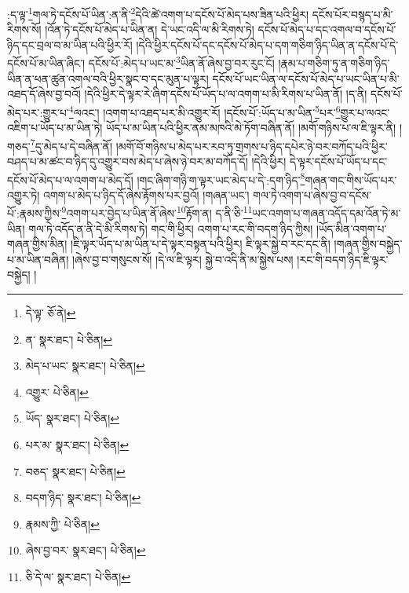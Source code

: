 :ད་ལྟ་\footnote{དེ་ལྟ་  ཅོ་ནེ། }གལ་ཏེ་དངོས་པོ་ཡིན་:ན་ནི་\footnote{ན་  སྣར་ཐང་།  པེ་ཅིན། }དེའི་ཚེ་འགག་པ་དངོས་པོ་མེད་པས་ཟིན་པའི་ཕྱིར། དངོས་པོར་བསྙད་པ་མི་རིགས་སོ། །འོན་ཏེ་དངོས་པོ་མེད་པ་ཡིན་ན། དེ་ཡང་འདི་ལ་མི་རིགས་ཏེ། དངོས་པོ་མེད་པ་དང་འགལ་བ་དངོས་པོ་ཉིད་དང་བྲལ་བ་མ་ཡིན་པའི་ཕྱིར་རོ། །དེའི་ཕྱིར་དངོས་པོ་དང་དངོས་པོ་མེད་པ་དག་གཅིག་ཉིད་ཡིན་ན་དངོས་པོ་དེ་དངོས་པོ་མ་ཡིན་ཞིང་། དངོས་པོ་:མེད་པ་ཡང་མ་\footnote{མེད་པ་ཡང་  སྣར་ཐང་།  པེ་ཅིན། }ཡིན་ནོ་ཞེས་བྱ་བར་རུང་ངོ། །རྣམ་པ་གཅིག་ཏུ་ན་གཅིག་ཉིད་ཡིན་ན་ཕན་ཚུན་འགལ་བའི་ཕྱིར་སྣང་བ་དང་མུན་པ་ལྟར། དངོས་པོ་ཡང་ཡིན་ལ་དངོས་པོ་མེད་པ་ཡང་ཡིན་པ་མི་འཐད་དོ་ཞེས་བྱ་བའོ། །དེའི་ཕྱིར་དེ་ལྟར་རེ་ཞིག་དངོས་པོ་ཡོད་པ་ལ་འགག་པ་མི་རིགས་པ་ཡིན་ནོ། །ད་ནི། དངོས་པོ་མེད་པར་:གྱུར་པ་\footnote{འགྱུར་  པེ་ཅིན། }ལའང་། །འགག་པ་འཐད་པར་མི་འགྱུར་རོ། །དངོས་པོ་:ཡོད་པ་མ་ཡིན་\footnote{ཡོད་  སྣར་ཐང་།  པེ་ཅིན། }པར་\footnote{པར་མ་  སྣར་ཐང་།  པེ་ཅིན། }གྱུར་པ་ལའང་འཇིག་པ་ཡོད་པ་མ་ཡིན་ཏེ། ཡོད་པ་མ་ཡིན་པའི་ཕྱིར་ནམ་མཁའི་མེ་ཏོག་བཞིན་ནོ། །མགོ་གཉིས་པ་ལ་ཇི་ལྟར་ནི། །གཅད་\footnote{བཅད་  སྣར་ཐང་།  པེ་ཅིན། }དུ་མེད་པ་དེ་བཞིན་ནོ། །མགོ་བོ་གཉིས་པ་མེད་པར་རབ་ཏུ་གྲགས་པ་ཉིད་དཔེར་ཉེ་བར་བཀོད་པའི་ཕྱིར་བཤད་པ་མ་ཚང་བ་ཉིད་དུ་འགྱུར་བས་མེད་པ་ཞེས་ཉེ་བར་མ་བཀོད་དོ། །དེའི་ཕྱིར། དེ་ལྟར་དངོས་པོ་ཡོད་པ་དང་དངོས་པོ་མེད་པ་ལ་འགག་པ་མེད་དོ། །གང་ཞིག་གཉི་ག་ལྟར་ཡང་མེད་པ་དེ་:དག་ཉིད་\footnote{བདག་ཉིད་  སྣར་ཐང་།  པེ་ཅིན། }གཞན་གང་གིས་ཡོད་པར་འགྱུར་ཏེ། འགག་པ་མེད་པ་ཉིད་དོ་ཞེས་རྟོགས་པར་བྱའོ། །གཞན་ཡང་། གལ་ཏེ་འགག་པ་ཞེས་བྱ་བ་དངོས་པོ་:རྣམས་ཀྱིས་\footnote{རྣམས་ཀྱི་  པེ་ཅིན། }འགག་པར་བྱེད་པ་ཡིན་ནོ་ཞེས་\footnote{ཞེས་བྱ་བར་  སྣར་ཐང་།  པེ་ཅིན། }རྟོག་ན། ད་ནི་ཅི་\footnote{ཅི་དེ་ལ་  སྣར་ཐང་།  པེ་ཅིན། }ཡང་འགག་པ་གཞན་འདོད་དམ་འོན་ཏེ་མ་ཡིན། གལ་ཏེ་འདོད་ན་ནི་དེ་མི་རིགས་ཏེ། གང་གི་ཕྱིར། འགག་པ་རང་གི་བདག་ཉིད་ཀྱིས། །ཡོད་མིན་འགག་པ་གཞན་གྱིས་མིན། །ཇི་ལྟར་ཡོད་པ་མ་ཡིན་པ་དེ་ལྟར་བསྟན་པའི་ཕྱིར། ཇི་ལྟར་སྐྱེ་བ་རང་དང་ནི། །གཞན་གྱིས་བསྐྱེད་པ་མ་ཡིན་བཞིན། །ཞེས་བྱ་བ་གསུངས་སོ། །དེ་ལ་ཇི་ལྟར། སྐྱེ་བ་འདི་ནི་མ་སྐྱེས་པས། །རང་གི་བདག་ཉིད་ཇི་ལྟར་བསྐྱེད། །
